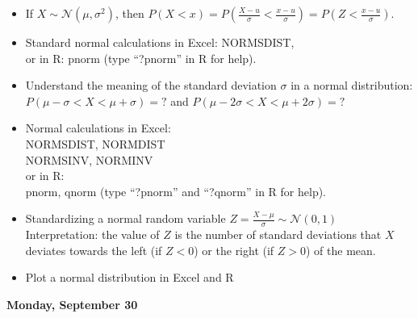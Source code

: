 \documentclass[11pt]{article}
\begin{document}
\begin{itemize}

\item If $X\sim\mathcal{N}(\mu,\sigma^2)$, then $P(X<x)=P(\frac{X-u}{\sigma}<\frac{x-u}{\sigma}) =P(Z<\frac{x-u}{\sigma})$.



\item Standard normal calculations in Excel: NORMSDIST, \\ or in R: pnorm  (type ``?pnorm'' in R for help).

\item Understand the meaning of the standard deviation $\sigma$ in a normal distribution: $P(\mu-\sigma<X<\mu+\sigma)=?$ and $P(\mu-2\sigma<X<\mu+2\sigma)=?$
\item Normal calculations in Excel: \\
NORMSDIST, NORMDIST\\
NORMSINV, NORMINV\\ 
or in R: \\
pnorm,  qnorm (type ``?pnorm'' and ``?qnorm'' in R for help).
\item Standardizing a normal random variable $Z=\frac{X-\mu}{\sigma}\sim\mathcal{N}(0,1)$\\
Interpretation: the value of $Z$ is the number of standard deviations that $X$ deviates towards  the left (if $Z<0$) or the right (if $Z>0$) of the mean.


\item Plot a normal distribution in Excel and R

\end{itemize}



\vspace{5mm}
\noindent\textbf{\large Monday, September 30} 	
\end{document}
